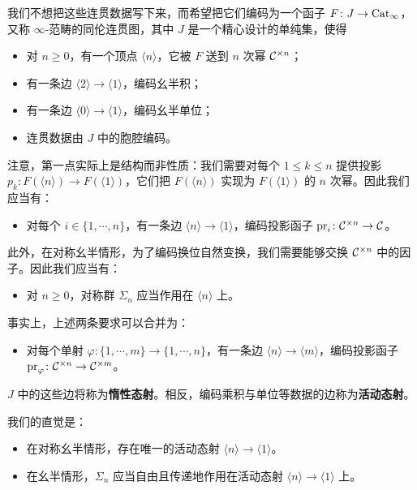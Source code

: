我们不想把这些连贯数据写下来，而希望把它们编码为一个函子 $F\colon J\to\operatorname{Cat}_{\infty}$，又称 $\infty$-范畴的同伦连贯图，其中 $J$ 是一个精心设计的单纯集，使得
\begin{itemize}[leftmargin=2.2em,itemsep=0.1em]
\item 对 $n\ge0$，有一个顶点 $\langle n\rangle$，它被 $F$ 送到 $n$ 次幂 $\mathcal{C}^{\times n}$；
\item 有一条边 $\langle 2\rangle\to\langle 1\rangle$，编码幺半积；
\item 有一条边 $\langle 0\rangle\to\langle 1\rangle$，编码幺半单位；
\item 连贯数据由 $J$ 中的胞腔编码。
\end{itemize}
注意，第一点实际上是结构而非性质：我们需要对每个 $1\le k\le n$ 提供投影 $p_k\colon F(\langle n\rangle)\to F(\langle 1\rangle)$，它们把 $F(\langle n\rangle)$ 实现为 $F(\langle 1\rangle)$ 的 $n$ 次幂。因此我们应当有：
\begin{itemize}[leftmargin=2.2em,itemsep=0.1em]
\item 对每个 $i\in\{1,\cdots,n\}$，有一条边 $\langle n\rangle\to\langle 1\rangle$，编码投影函子 $\mathrm{pr}_i\colon\mathcal{C}^{\times n}\to\mathcal{C}$。
\end{itemize}
此外，在对称幺半情形，为了编码换位自然变换，我们需要能够交换 $\mathcal{C}^{\times n}$ 中的因子。因此我们应当有：
\begin{itemize}[leftmargin=2.2em,itemsep=0.1em]
\item 对 $n\ge0$，对称群 $\Sigma_n$ 应当作用在 $\langle n\rangle$ 上。
\end{itemize}

事实上，上述两条要求可以合并为：
\begin{itemize}[leftmargin=2.2em,itemsep=0.1em]
\item 对每个单射 $\varphi\colon\{1,\cdots,m\}\to\{1,\cdots,n\}$，有一条边 $\langle n\rangle\to\langle m\rangle$，编码投影函子 $\mathrm{pr}_{\varphi}\colon\mathcal{C}^{\times n}\to\mathcal{C}^{\times m}$。
\end{itemize}
$J$ 中的这些边将称为\textbf{惰性态射}。相反，编码乘积与单位等数据的边称为\textbf{活动态射}。

我们的直觉是：
\begin{itemize}[leftmargin=2.2em,itemsep=0.1em]
\item 在对称幺半情形，存在唯一的活动态射 $\langle n\rangle\to\langle 1\rangle$。
\item 在幺半情形，$\Sigma_n$ 应当自由且传递地作用在活动态射 $\langle n\rangle\to\langle 1\rangle$ 上。
\end{itemize}

